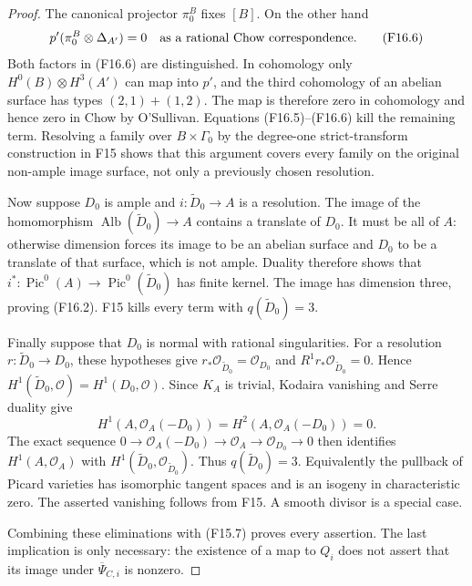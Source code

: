 \documentclass[11pt]{article}
\theoremstyle{remark}\newtheorem{remark}[theorem]{Remark}
\begin{document}
\begin{proof}
The canonical projector $\pi_0^B$ fixes $[B]$.  On the other hand
\[
                  p'(\pi_0^B\otimes\Delta_{A'})=0
       \quad\hbox{as a rational Chow correspondence}.
 \tag{F16.6}
\]
Both factors in (F16.6) are distinguished.  In cohomology only
$H^0(B)\otimes H^3(A')$ can map into $p'$, and the third
cohomology of an abelian surface has types $(2,1)+(1,2)$.
The map is therefore zero in cohomology and hence zero in Chow
by O'Sullivan.  Equations (F16.5)--(F16.6) kill the remaining
term.  Resolving a family over $B\times\Gamma_0$ by the
degree-one strict-transform construction in F15 shows that this
argument covers every family on the original non-ample image
surface, not only a previously chosen resolution.

Now suppose $D_0$ is ample and $i:\widetilde D_0\to A$ is a
resolution.  The image of the homomorphism
$\operatorname{Alb}(\widetilde D_0)\to A$ contains a translate
of $D_0$.  It must be all of $A$: otherwise dimension forces
its image to be an abelian surface and $D_0$ to be a translate
of that surface, which is not ample.  Duality therefore shows
that $i^*:\operatorname{Pic}^0(A)\to
\operatorname{Pic}^0(\widetilde D_0)$ has finite kernel.
The image has dimension three, proving (F16.2).  F15 kills
every term with $q(\widetilde D_0)=3$.

Finally suppose that $D_0$ is normal with rational singularities.
For a resolution $r:\widetilde D_0\to D_0$, these hypotheses
give $r_*\mathcal O_{\widetilde D_0}=\mathcal O_{D_0}$ and
$R^1r_*\mathcal O_{\widetilde D_0}=0$.  Hence
$H^1(\widetilde D_0,\mathcal O)=H^1(D_0,\mathcal O)$.
Since $K_A$ is trivial, Kodaira vanishing and Serre duality give
\[
 H^1(A,\mathcal O_A(-D_0))=
 H^2(A,\mathcal O_A(-D_0))=0.
 \tag{F16.7}
\]
The exact sequence
$0\to\mathcal O_A(-D_0)\to\mathcal O_A\to
\mathcal O_{D_0}\to0$ then identifies
$H^1(A,\mathcal O_A)$ with
$H^1(\widetilde D_0,\mathcal O_{\widetilde D_0})$.
Thus $q(\widetilde D_0)=3$.  Equivalently the pullback of
Picard varieties has isomorphic tangent spaces and is an
isogeny in characteristic zero.  The asserted vanishing follows
from F15.  A smooth divisor is a special case.

Combining these eliminations with (F15.7) proves every assertion.
The last implication is only necessary: the existence of a map
to $Q_i$ does not assert that its image under
$\overline\Psi_{C,i}$ is nonzero.
\end{proof}
\end{document}
